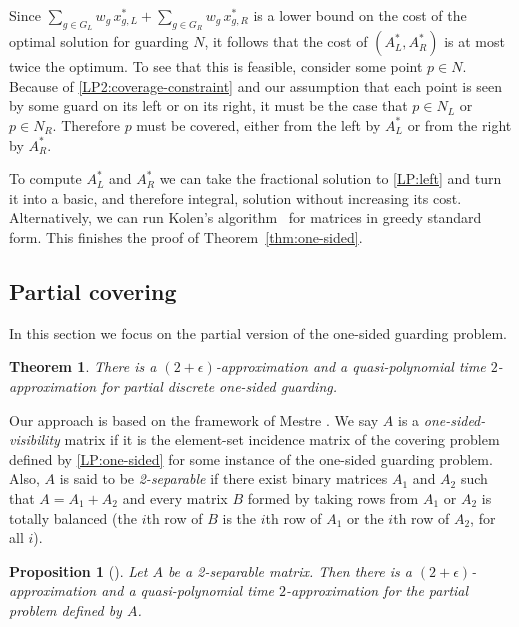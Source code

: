 \documentclass[11pt]{article}
\newtheorem{theorem}{Theorem}
\newtheorem{proposition}{Proposition}
\begin{document}
Since $\sum_{g \in G_L} w_g\, x^*_{g,L} + \sum_{g \in G_R} w_g \, x^*_{g,R}$
is a lower bound on the cost of the optimal solution for guarding $N$, it follows that
the cost of $(A_L^* , A_R^*)$ is at most twice the optimum. To see that this
is feasible, consider some point $p \in N$. Because of
\eqref{LP2:coverage-constraint} and our assumption that each point is seen by
some guard on its left or on its right, it must be the case that $p \in N_L$
or $p \in N_R$. Therefore $p$ must be covered, either from the left by $A_L^*$
or from the right by $A_R^*$.

To compute $A^*_L$ and $A^*_R$ we can take the fractional solution to
\eqref{LP:left} and turn it into a basic, and therefore integral, solution
without increasing its cost. Alternatively, we can run Kolen's
algorithm~\cite{thesis/Kolen82} for matrices in greedy standard form. This
finishes the proof of Theorem~\ref{thm:one-sided}.

\subsection{Partial covering}

In this section we focus on the partial version of the one-sided guarding problem.

\begin{theorem} \label{thm:partial}
  There is a $(2 + \epsilon)$-approximation and a quasi-polynomial time
  $2$-approximation for partial discrete one-sided guarding.
\end{theorem}

Our approach is based on the framework of Mestre
\cite{conf/stacs/Mestre08}. We say $A$ is a \emph{one-sided-visibility} matrix
if it is the element-set incidence matrix of the covering problem defined by
\eqref{LP:one-sided} for some instance of the one-sided guarding problem.
Also, $A$ is said to be \emph{2-separable} if there exist binary matrices $A_1$
and $A_2$ such that $A = A_1 + A_2$ and every matrix $B$ formed by taking rows
from $A_1$ or $A_2$ is totally balanced (the $i$th row of $B$ is the $i$th row
of $A_1$ or the $i$th row of $A_2$, for all $i$).

\begin{proposition}[\cite{conf/stacs/Mestre08}] \label{prop:partial}
  Let $A$ be a 2-separable matrix. Then there is a $(2 + \epsilon)$-approximation
  and a quasi-polynomial time $2$-approximation for the partial
  problem defined by $A$.
\end{proposition}
\end{document}
